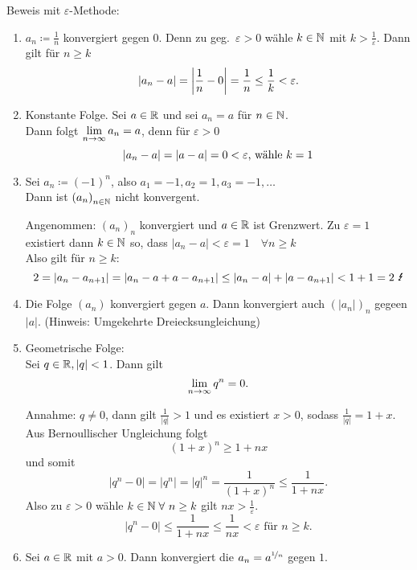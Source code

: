 \documentclass[../ana1.tex]{subfiles}
\begin{document}
\begin{bsp}
	Beweis mit \(\varepsilon \)-Methode:
	\begin{enumerate}
		\item \(a_n \coloneqq \frac{1}{n}\) konvergiert gegen \(0\). Denn zu geg.\  \(\varepsilon > 0\) wähle \(k\in\mathbb{N} \) mit \(k>\frac{1}{\varepsilon}\). Dann gilt für \(n\geq k\)
		\[ \left|a_n-a\right| = \left|\frac{1}{n} - 0\right| = \frac{1}{n} \leq \frac{1}{k} < \varepsilon.\]
		\item Konstante Folge. Sei \(a\in\mathbb{R} \) und sei \(a_n = a\) für \(n\in\mathbb{N} \).\\
		Dann folgt \(\lim\limits_{n\rightarrow\infty} a_n = a\), denn für \(\varepsilon > 0\)
		\[ \left|a_n - a\right| = |a-a|=0<\varepsilon \text{, wähle } k=1\]
		\item Sei \(a_n \coloneqq {(-1)}^n\), also \(a_1 = -1, a_2 = 1, a_3 = -1, \ldots \) \\
		Dann ist \({(a_n)}_{n\in\mathbb{N}}\) nicht konvergent.
		\begin{bew}
			Angenommen: \({(a_n)}_n\) konvergiert und \(a\in\mathbb{R} \) ist Grenzwert. Zu \(\varepsilon = 1\) existiert dann \(k\in\mathbb{N} \) so, dass \(|a_n - a| < \varepsilon = 1 \quad \forall n\geq k\) \\
			Also gilt für \(n\geq k\):
			\[2 = |a_n - a_{n+1}| = |a_n - a + a - a_{n+1}| \leq |a_n - a| + |a-a_{n+1}| < 1 + 1 = 2 \text{ \Lightning}\]
		\end{bew}
		\item Die Folge \((a_n)\) konvergiert gegen \(a\). Dann konvergiert auch \({(|a_n|)}_n\) gegeen \(|a|\). (Hinweis: Umgekehrte Dreiecksungleichung)
		\item Geometrische Folge:\\
		Sei \(q\in\mathbb{R}, |q|<1\). Dann gilt
		\[\lim\limits_{n\rightarrow\infty} q^n = 0.\]
		\begin{bew}
			Annahme: \(q\neq 0\), dann gilt \(\frac{1}{|q|}>1\) und es existiert \(x>0\), sodass \(\frac{1}{|q|} = 1 + x\).\\
			Aus Bernoullischer Ungleichung folgt 
			\[ {(1+x)}^n \geq 1+nx \]
			und somit 
			\[ |q^n-0| = |q^n| = |q|^n = \frac{1}{{(1+x)}^n} \leq \frac{1}{1+nx}. \]
			Also zu \(\varepsilon > 0\) wähle \(k\in\N \; \forall \, n\geq k\) gilt \(nx > \frac{1}{\varepsilon}\).
			\[|q^n-0|\leq \frac{1}{1+nx} \leq \frac{1}{nx} < \varepsilon \text{ für } n\geq k.\]
		\end{bew}
		\item Sei \(a\in\mathbb{R} \) mit \(a>0\). Dann konvergiert die \(a_n = a^{\nicefrac{1}{n}}\) gegen \(1\).
		\begin{bew}\hfill \\

\end{bew}
\end{enumerate}
\end{bsp}
\end{document}
